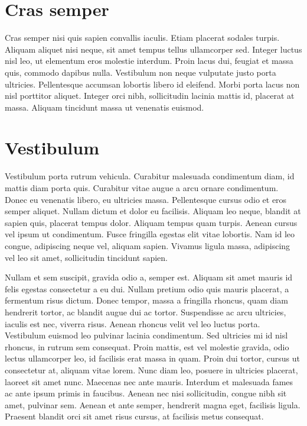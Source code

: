 \documentclass[11pt,a4paper,english]{report}
\begin{document}
\section{Cras semper}
\par Cras semper nisi quis sapien convallis iaculis. Etiam placerat sodales turpis. Aliquam aliquet nisi neque, sit amet tempus tellus ullamcorper sed. Integer luctus nisl leo, ut elementum eros molestie interdum. Proin lacus dui, feugiat et massa quis, commodo dapibus nulla. Vestibulum non neque vulputate justo porta ultricies. Pellentesque accumsan lobortis libero id eleifend. Morbi porta lacus non nisl porttitor aliquet. Integer orci nibh, sollicitudin lacinia mattis id, placerat at massa. Aliquam tincidunt massa ut venenatis euismod.

\section{Vestibulum}
\par Vestibulum porta rutrum vehicula. Curabitur malesuada condimentum diam, id mattis diam porta quis. Curabitur vitae augue a arcu ornare condimentum. Donec eu venenatis libero, eu ultricies massa. Pellentesque cursus odio et eros semper aliquet. Nullam dictum et dolor eu facilisis. Aliquam leo neque, blandit at sapien quis, placerat tempus dolor. Aliquam tempus quam turpis. Aenean cursus vel ipsum ut condimentum. Fusce fringilla egestas elit vitae lobortis. Nam id leo congue, adipiscing neque vel, aliquam sapien. Vivamus ligula massa, adipiscing vel leo sit amet, sollicitudin tincidunt sapien.

\par Nullam et sem suscipit, gravida odio a, semper est. Aliquam sit amet mauris id felis egestas consectetur a eu dui. Nullam pretium odio quis mauris placerat, a fermentum risus dictum. Donec tempor, massa a fringilla rhoncus, quam diam hendrerit tortor, ac blandit augue dui ac tortor. Suspendisse ac arcu ultricies, iaculis est nec, viverra risus. Aenean rhoncus velit vel leo luctus porta. Vestibulum euismod leo pulvinar lacinia condimentum. Sed ultricies mi id nisl rhoncus, in rutrum sem consequat. Proin mattis, est vel molestie gravida, odio lectus ullamcorper leo, id facilisis erat massa in quam. Proin dui tortor, cursus ut consectetur at, aliquam vitae lorem. Nunc diam leo, posuere in ultricies placerat, laoreet sit amet nunc. Maecenas nec ante mauris. Interdum et malesuada fames ac ante ipsum primis in faucibus. Aenean nec nisi sollicitudin, congue nibh sit amet, pulvinar sem. Aenean et ante semper, hendrerit magna eget, facilisis ligula. Praesent blandit orci sit amet risus cursus, at facilisis metus consequat.
\end{document}
